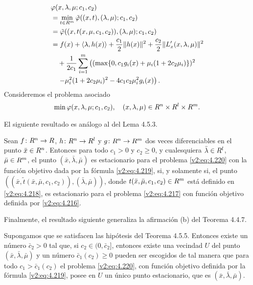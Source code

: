 \begin{align}
    &\varphi(x, \lambda, \mu; c_1, c_2) \nonumber \\
    &= \min_{t \in R^m} \tilde{\varphi}((x, t), (\lambda, \mu); c_1, c_2) \nonumber \\
    &= \tilde{\varphi}((x, t(x, \mu, c_1, c_2)), (\lambda, \mu); c_1, c_2) \nonumber \\
    &= f(x) + \langle \lambda, h(x) \rangle + \frac{c_1}{2}\|h(x)\|^2 + \frac{c_2}{2}\|L'_x(x, \lambda, \mu)\|^2 \nonumber \\
    &\quad + \frac{1}{2c_1} \sum_{i=1}^m \left( (\max\{0, c_1 g_i(x) + \mu_i(1 + 2c_2\mu_i)\})^2 \right. \nonumber \\
    &\quad \left. - \mu_i^2(1 + 2c_2\mu_i)^2 - 4c_1 c_2 \mu_i^2 g_i(x) \right).
    \label{v2:eq:4.219}
\end{align}
Consideremos el problema asociado
\begin{equation}
    \min \varphi(x, \lambda, \mu; c_1, c_2), \quad (x, \lambda, \mu) \in R^n \times R^l \times R^m.
    \label{v2:eq:4.220}
\end{equation}


El siguiente resultado es análogo al del Lema 4.5.3.

\begin{lemma}\label{v2:lem:4.5.8}
    Sean $f \colon R^n \to R$, $h \colon R^n \to R^l$ y $g \colon R^n \to R^m$ dos veces diferenciables en el punto $\bar{x} \in R^n$.
    Entonces para todo $c_1 > 0$ y $c_2 \ge 0$, y cualesquiera $\bar{\lambda} \in R^l$, $\bar{\mu} \in R^m$, el punto $(\bar{x}, \bar{\lambda}, \bar{\mu})$ es estacionario para el problema \eqref{v2:eq:4.220} con la función objetivo dada por la fórmula \eqref{v2:eq:4.219}, si, y solamente si, el punto $((\bar{x}, \tilde{t}(\bar{x}, \bar{\mu}, c_1, c_2)), (\bar{\lambda}, \bar{\mu}))$, donde $t(\bar{x}, \bar{\mu}, c_1, c_2) \in R^m$ está definido en \eqref{v2:eq:4.218}, es estacionario para el problema \eqref{v2:eq:4.217} con función objetivo definida por \eqref{v2:eq:4.216}.
\end{lemma}


Finalmente, el resultado siguiente generaliza la afirmación (b) del Teorema 4.4.7.

\begin{theorem}\label{v2:thm:4.5.8}
    Supongamos que se satisfacen las hipótesis del Teorema 4.5.5.
    Entonces existe un número $\bar{c}_2 > 0$ tal que, si $c_2 \in (0, \bar{c}_2]$, entonces existe una vecindad $U$ del punto $(\bar{x}, \bar{\lambda}, \bar{\mu})$ y un número $\bar{c}_1(c_2) \ge 0$ pueden ser escogidos de tal manera que para todo $c_1 > \bar{c}_1(c_2)$ el problema \eqref{v2:eq:4.220}, con función objetivo definida por la fórmula \eqref{v2:eq:4.219}, posee en $U$ un único punto estacionario, que es $(\bar{x}, \bar{\lambda}, \bar{\mu})$.
\end{theorem}

